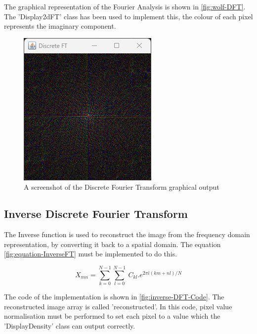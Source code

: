    The graphical representation of the Fourier Analysis is shown in \autoref{fig:wolf-DFT}. The 'Display2dFT' class has been used to implement this, the colour of each pixel represents the imaginary component.
    
    \begin{figure}[H]
        \centering
        \includegraphics[width=0.49\columnwidth]{Figures/Week 1/W1-FT.png}
        \caption{A screenshot of the Discrete Fourier Transform graphical output}
        \label{fig:wolf-DFT}
    \end{figure}
    
    
    \subsection{Inverse Discrete Fourier Transform}
    The Inverse function is used to reconstruct the image from the frequency domain representation, by converting it back to a spatial domain. The equation \autoref{fig:equation-InverseFT} must be implemented to do this. 

    \begin{center}
        \begin{equation}
            X_{mn} = \sum_{k=0}^{N-1} \sum_{l=0}^{N-1}\ C_{kl} . e^{2\pi i(km+nl)/N}
            \label{fig:equation-InverseFT}
        \end{equation}  
        \end{center}
        
    The code of the implementation is shown in \autoref{fig:inverse-DFT-Code}. The reconstructed image array is called 'reconstructed'.  
    In this code, pixel value normalisation must be performed to set each pixel to a value which the 'DisplayDensity' class can output correctly. 
        
